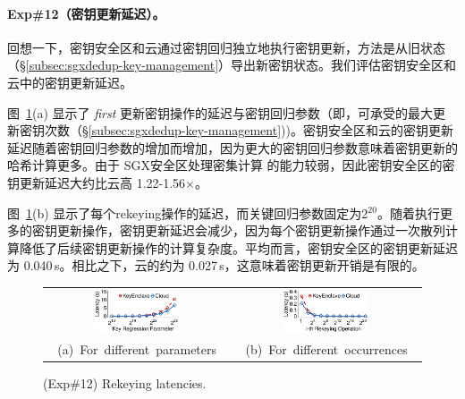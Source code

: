 \paragraph*{Exp\#12（密钥更新延迟）。} 回想一下，密钥安全区和云通过密钥回归独立地执行密钥更新，方法是从旧状态（\S\ref{subsec:sgxdedup-key-management}）导出新密钥状态。我们评估密钥安全区和云中的密钥更新延迟。

图~\ref{fig:sgxdedup-rekeyingLatency}(a) 显示了 \textit{ first} 更新密钥操作的延迟与密钥回归参数（即，可承受的最大更新密钥次数（\S\ref{subsec:sgxdedup-key-management}))。密钥安全区和云的密钥更新延迟随着密钥回归参数的增加而增加，因为更大的密钥回归参数意味着密钥更新的哈希计算更多。由于 SGX安全区处理密集计算 \cite{harnik18} 的能力较弱，因此密钥安全区的密钥更新延迟大约比云高 1.22-1.56$\times$。

图~\ref{fig:sgxdedup-rekeyingLatency}(b) 显示了每个rekeying操作的延迟，而关键回归参数固定为2$^{20}$。随着执行更多的密钥更新操作，密钥更新延迟会减少，因为每个密钥更新操作通过一次散列计算降低了后续密钥更新操作的计算复杂度。平均而言，密钥安全区的密钥更新延迟为 0.040\,s。相比之下，云的约为 0.027\,s，这意味着密钥更新开销是有限的。

\begin{figure}[t]
\centering
\begin{tabular}{@{\ }c@{\ }c}
\includegraphics[width=0.48\textwidth]{pic/sgxdedup/expa5_keyRegression_time.pdf} &
\includegraphics[width=0.48\textwidth]{pic/sgxdedup/expa5_keyRegression_time_default.pdf} \\
\mbox{\small (a) For different parameters} &
\mbox{\small (b) For different occurrences}
\end{tabular}
\caption{(Exp\#12) Rekeying latencies.}
\label{fig:sgxdedup-rekeyingLatency}
\end{figure}
